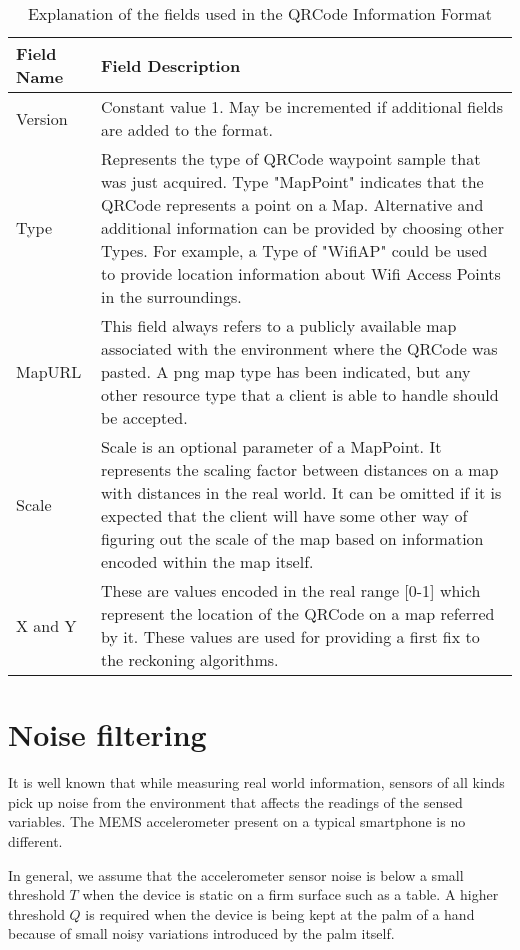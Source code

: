 \begin{table}
\centering
\begin{tabular}{p{1.5in} p{4.5in}}
\hline
\hline
Field Name      &       Field Description \\
\hline
Version         & Constant value 1. May be incremented if additional fields are added to the format. \\
Type            & Represents the type of QRCode waypoint sample that was just acquired. Type "MapPoint" indicates that the QRCode represents a point on a Map. Alternative and  additional information can be provided by choosing other Types. For example,  a Type of "WifiAP" could be used to provide location information about  Wifi Access Points in the surroundings. \\
MapURL          & This field always refers to a publicly available map associated with the environment where  the QRCode was pasted. A png map type has been indicated, but any other resource type that  a client is able to handle should be accepted. \\
Scale           & Scale is an optional parameter of a MapPoint. It represents the scaling factor between distances on a map with distances in the real world. It can be omitted if it is expected that the  client will have some other way of figuring out the scale of the map based on information encoded within the map itself. \\
X and Y         & These are values encoded in the real range [0-1] which represent the location of the QRCode on a map referred by it. These values are used for providing a first fix to the  reckoning algorithms.  \\
\hline
\end{tabular}
\caption{Explanation of the fields used in the QRCode Information Format\label{tbl:QRCode_fields_table}}
\end{table}

\section{Noise filtering\label{sec:NoiseClamping}}

It is well known that while measuring real world information, sensors of all 
kinds pick up noise from the environment that affects the readings of the 
sensed variables. The MEMS accelerometer present on a typical smartphone is 
no different. 

In general, we assume that the accelerometer sensor noise is below a small 
threshold $T$ when the device is static on a firm surface such as a table. 
A higher threshold $Q$ is required when the device is being kept at the palm of 
a hand because of small noisy variations introduced by the palm itself.

